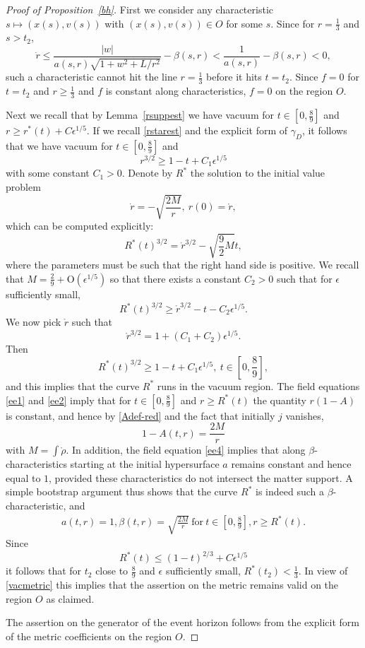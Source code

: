\documentclass[11pt]{article}
\begin{document}
\begin{proof}[Proof of Proposition~\ref{bh}]
  First we consider any characteristic
  $s\mapsto (x(s),v(s))$ with $(x(s),v(s)) \in O$ for some $s$.
  Since for $r=\frac{1}{3}$ and $s>t_2$,
  \[
  \dot r \leq \frac{|w|}{a(s,r) \sqrt{1+w^2+L/r^2}} - \beta(s,r)
  < \frac{1}{a(s,r)} - \beta(s,r) < 0,
  \]
  such a characteristic cannot hit the line $r = \frac{1}{3}$ before it hits
  $t=t_2$. Since  $f=0$ for $t=t_2$ and $r \geq \frac{1}{3}$
  and $f$ is constant along characteristics, $f=0$ on the region $O$.
  
  Next we recall that by Lemma~\ref{rsuppest}
  we have vacuum for $t\in [0,\frac{8}{9}]$
  and $r\geq r^\ast (t) + C \epsilon^{1/5}$. If we recall \eqref{rstarest}
  and the explicit form of $\gamma_D$, it follows that we have
  vacuum for $t\in [0,\frac{8}{9}]$ and
  \[
  r^{3/2} \geq 1-t + C_1 \epsilon^{1/5}
  \]
  with some constant $C_1>0$. Denote by
  $R^\ast$ the solution to the initial value problem
  \[
  \dot r = -\sqrt{\frac{2M}{r}},\ r(0)=\mathring r,
  \]
  which can be computed explicitly:
  \[
  R^\ast(t)^{3/2} = \mathring r^{3/2} - \sqrt{\frac{9}{2} M} t,
  \]
  where the parameters must be such that the right hand side is positive.
  We recall that $M=\frac{2}{9} + \mathrm{O}(\epsilon^{1/5})$ so that
  there exists a constant $C_2>0$ such that for $\epsilon$ sufficiently small,
  \[
  R^\ast(t)^{3/2} \geq \mathring r^{3/2} - t - C_2 \epsilon^{1/5}.
  \]
  We now pick $\mathring r$ such that
  \[
  \mathring r^{3/2} = 1 + (C_1+C_2)\epsilon^{1/5}.
  \]
  Then
  \[
  R^\ast(t)^{3/2} \geq 1-t + C_1 \epsilon^{1/5},\ t\in[0,\frac{8}{9}],
  \]
  and this implies that the curve $R^\ast$ runs in the vacuum region.
  The field equations \eqref{ee1} and \eqref{ee2} imply that
  for $t\in[0,\frac{8}{9}]$ and $r\geq R^\ast(t)$
  the quantity $r(1-A)$ is constant,
  and hence by \eqref{Adef-red} and the fact that initially $j$
  vanishes,
  \[
  1-A(t,r) = \frac{2 M}{r}
  \]
  with $M=\int\mathring\rho$. In addition, the field equation \eqref{ee4}
  implies that along $\beta$-characteristics starting at the initial
  hypersurface $a$ remains constant and hence equal to $1$, provided these
  characteristics do not intersect the matter support. A simple bootstrap
  argument thus shows that the curve $R^\ast$ is indeed such a
  $\beta$-characteristic, and
  \begin{align}\label{vacmetric}
    a(t,r)= 1, \beta(t,r)= \sqrt{\frac{2 M}{r}} \ \mbox{for}\
    t\in [0,\frac{8}{9}], r\geq R^\ast(t).
  \end{align}
  Since
  \[
  R^\ast (t) \leq (1-t)^{2/3} + C \epsilon^{1/5}
  \]
  it follows that for $t_2$
  close to $\frac{8}{9}$ and $\epsilon$ sufficiently small,
  $R^\ast (t_2) < \frac{1}{3}$. In view of \eqref{vacmetric}
  this implies that the assertion on the metric remains valid
  on the region $O$ as claimed.
  
  The assertion on the generator of the event horizon follows from the
  explicit form of the metric coefficients on the region $O$. 
\end{proof}
\end{document}
